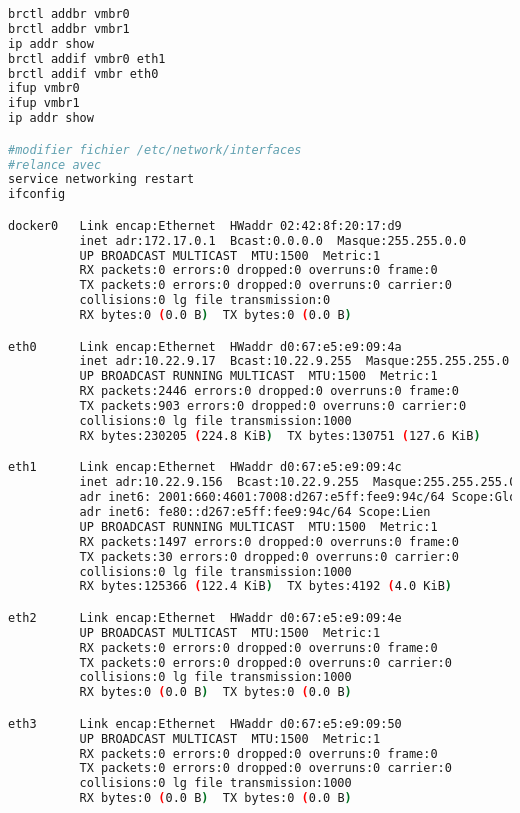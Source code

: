 \documentclass[french]{article}
\begin{document}
\begin{lstlisting}[language=bash,caption={}]
brctl addbr vmbr0
brctl addbr vmbr1
ip addr show
brctl addif vmbr0 eth1 
brctl addif vmbr eth0
ifup vmbr0
ifup vmbr1
ip addr show 

#modifier fichier /etc/network/interfaces
#relance avec 
service networking restart
ifconfig

docker0   Link encap:Ethernet  HWaddr 02:42:8f:20:17:d9  
          inet adr:172.17.0.1  Bcast:0.0.0.0  Masque:255.255.0.0
          UP BROADCAST MULTICAST  MTU:1500  Metric:1
          RX packets:0 errors:0 dropped:0 overruns:0 frame:0
          TX packets:0 errors:0 dropped:0 overruns:0 carrier:0
          collisions:0 lg file transmission:0 
          RX bytes:0 (0.0 B)  TX bytes:0 (0.0 B)

eth0      Link encap:Ethernet  HWaddr d0:67:e5:e9:09:4a  
          inet adr:10.22.9.17  Bcast:10.22.9.255  Masque:255.255.255.0
          UP BROADCAST RUNNING MULTICAST  MTU:1500  Metric:1
          RX packets:2446 errors:0 dropped:0 overruns:0 frame:0
          TX packets:903 errors:0 dropped:0 overruns:0 carrier:0
          collisions:0 lg file transmission:1000 
          RX bytes:230205 (224.8 KiB)  TX bytes:130751 (127.6 KiB)

eth1      Link encap:Ethernet  HWaddr d0:67:e5:e9:09:4c  
          inet adr:10.22.9.156  Bcast:10.22.9.255  Masque:255.255.255.0
          adr inet6: 2001:660:4601:7008:d267:e5ff:fee9:94c/64 Scope:Global
          adr inet6: fe80::d267:e5ff:fee9:94c/64 Scope:Lien
          UP BROADCAST RUNNING MULTICAST  MTU:1500  Metric:1
          RX packets:1497 errors:0 dropped:0 overruns:0 frame:0
          TX packets:30 errors:0 dropped:0 overruns:0 carrier:0
          collisions:0 lg file transmission:1000 
          RX bytes:125366 (122.4 KiB)  TX bytes:4192 (4.0 KiB)

eth2      Link encap:Ethernet  HWaddr d0:67:e5:e9:09:4e  
          UP BROADCAST MULTICAST  MTU:1500  Metric:1
          RX packets:0 errors:0 dropped:0 overruns:0 frame:0
          TX packets:0 errors:0 dropped:0 overruns:0 carrier:0
          collisions:0 lg file transmission:1000 
          RX bytes:0 (0.0 B)  TX bytes:0 (0.0 B)

eth3      Link encap:Ethernet  HWaddr d0:67:e5:e9:09:50  
          UP BROADCAST MULTICAST  MTU:1500  Metric:1
          RX packets:0 errors:0 dropped:0 overruns:0 frame:0
          TX packets:0 errors:0 dropped:0 overruns:0 carrier:0
          collisions:0 lg file transmission:1000 
          RX bytes:0 (0.0 B)  TX bytes:0 (0.0 B)


\end{lstlisting}
\end{document}
